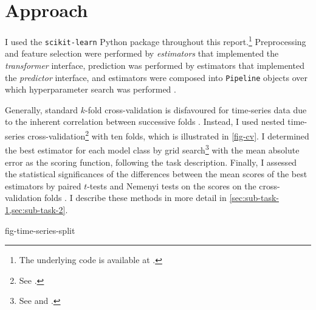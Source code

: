 \section{Approach}
\label{sec:approach}

I used the \texttt{scikit-learn} Python package \parencite{Pedregosa2011} throughout
this report.\footnote{The underlying code is available at
  .
}
Preprocessing and feature selection were performed by \emph{estimators} that
implemented the \emph{transformer} interface, prediction was performed by estimators
that implemented the \emph{predictor} interface, and estimators were composed into
\texttt{Pipeline} objects over which hyperparameter search was performed
\parencite[4-9]{Buitinck2013}.

Generally, standard $k$-fold cross-validation is disfavoured for time-series data due
to the inherent correlation between successive folds \parencite{Bergmeir2018}.
Instead, I used nested time-series cross-validation\footnote{See
  .
} with ten folds, which is illustrated in
\cref{fig-cv}.
I determined the best estimator for each model class by grid search\footnote{See
   and
  .
} with the mean absolute error as the scoring function, following the task description.
Finally, I assessed the statistical significances of the differences between the mean
scores of the best estimators by paired $t$-tests and Nemenyi tests on the scores on
the cross-validation folds \parencite[353-354]{Flach2012}.
I describe these methods in more detail in \cref{sec:sub-task-1,sec:sub-task-2}.

{fig-time-series-split}